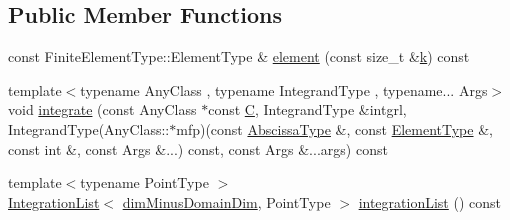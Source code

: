 \subsection*{Public Member Functions}
\begin{DoxyCompactItemize}
\item 
const Finite\+Element\+Type\+::\+Element\+Type \& \hyperlink{structmodel_1_1_integration_domain_3_01_finite_element_type_00_011_00_01q_order_00_01_quadrature_rule_01_4_a74fb0fe8cdd3332d16dfd9e9d603642e}{element} (const size\+\_\+t \&\hyperlink{_f_e_m_2linear__elasticity__3d_2tetgen_2generate_p_o_l_ycube_8m_a5d2aad4440da75aa43f2643e72b1a3bd}{k}) const 
\item 
{\footnotesize template$<$typename Any\+Class , typename Integrand\+Type , typename... Args$>$ }\\void \hyperlink{structmodel_1_1_integration_domain_3_01_finite_element_type_00_011_00_01q_order_00_01_quadrature_rule_01_4_aca6ac5a79c44c7b7ec0c102417c98298}{integrate} (const Any\+Class $\ast$const \hyperlink{plot_cells_8m_aaa53ca0b650dfd85c4f59fa156f7a2cc}{C}, Integrand\+Type \&intgrl, Integrand\+Type(Any\+Class\+::$\ast$mfp)(const \hyperlink{structmodel_1_1_integration_domain_3_01_finite_element_type_00_011_00_01q_order_00_01_quadrature_rule_01_4_a7e1987441ecbe7f224f67657f97d115e}{Abscissa\+Type} \&, const \hyperlink{structmodel_1_1_integration_domain_3_01_finite_element_type_00_011_00_01q_order_00_01_quadrature_rule_01_4_a0c38472ef1c1f37f1c32e49a5cdc2f71}{Element\+Type} \&, const int \&, const Args \&...) const, const Args \&...args) const 
\item 
{\footnotesize template$<$typename Point\+Type $>$ }\\\hyperlink{structmodel_1_1_integration_list}{Integration\+List}$<$ \hyperlink{structmodel_1_1_integration_domain_3_01_finite_element_type_00_011_00_01q_order_00_01_quadrature_rule_01_4_a6e8e93aabff3aad5399c80ef79ed616d}{dim\+Minus\+Domain\+Dim}, Point\+Type $>$ \hyperlink{structmodel_1_1_integration_domain_3_01_finite_element_type_00_011_00_01q_order_00_01_quadrature_rule_01_4_a4c76eb5046c036bc59d0f6d05421a47f}{integration\+List} () const 
\end{DoxyCompactItemize}
